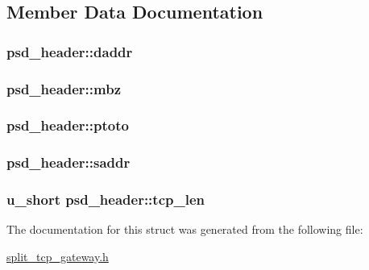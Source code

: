 \subsection{\-Member \-Data \-Documentation}
\hypertarget{structpsd__header_ac41be6ffba22a86307644444a818f419}{
\subsubsection[{daddr}]{ {\bf psd\-\_\-header\-::daddr}}}\label{structpsd__header_ac41be6ffba22a86307644444a818f419}
\hypertarget{structpsd__header_a8790d2f82a9b2031d8144f2627c4f4c9}{
\subsubsection[{mbz}]{ {\bf psd\-\_\-header\-::mbz}}}\label{structpsd__header_a8790d2f82a9b2031d8144f2627c4f4c9}
\hypertarget{structpsd__header_ac3af2de6f30534e1cf4b3d8985c12a83}{
\subsubsection[{ptoto}]{ {\bf psd\-\_\-header\-::ptoto}}}\label{structpsd__header_ac3af2de6f30534e1cf4b3d8985c12a83}
\hypertarget{structpsd__header_af934fedec53c4ea727c2f5f341f50595}{
\subsubsection[{saddr}]{ {\bf psd\-\_\-header\-::saddr}}}\label{structpsd__header_af934fedec53c4ea727c2f5f341f50595}
\hypertarget{structpsd__header_a13e8c4030f69d21c7f78ab54e75ef43c}{
\subsubsection[{tcp\-\_\-len}]{\setlength{\rightskip}{0pt plus 5cm}u\-\_\-short {\bf psd\-\_\-header\-::tcp\-\_\-len}}}\label{structpsd__header_a13e8c4030f69d21c7f78ab54e75ef43c}


\-The documentation for this struct was generated from the following file\-:\begin{DoxyCompactItemize}
\item 
\hyperlink{split__tcp__gateway_8h}{split\-\_\-tcp\-\_\-gateway.\-h}\end{DoxyCompactItemize}
